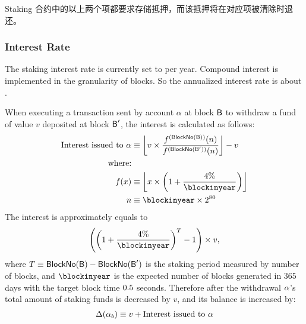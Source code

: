 Staking 合约中的以上两个项都要求存储抵押，而该抵押将在对应项被清除时退还。



\subsubsection{Interest Rate}

The staking interest rate is currently set to \interest per year.
Compound interest is implemented in the granularity of blocks.
So the annualized interest rate is about \annualinterest.

When executing a transaction sent by account $\alpha$ at block $\textsf{B}$ to withdraw a fund of value $v$ deposited at block $\textsf{B}'$,
the interest is calculated as follows:
\begin{align}
	\text{Interest issued to $\account$} 
	&\eqdef \left\lfloor v \times \frac{f^{(\blockno(\block))}(n)}{f^{(\blockno(\block'))}(n)} \right\rfloor- v \\ 
	\mbox{where:}& \\
	f(x) &\eqdef \left\lfloor x \times \left(1+\frac{\interest}{\blockinyear}\right)\right\rfloor \\
	n &\eqdef \blockinyear \times 2^{80}
\end{align}
The interest is approximately equals to 
\begin{align}
	\left(\left(1+\frac{\interest}{\blockinyear}\right)^T-1\right)\times v, 
\end{align}
where $T\equiv\mathsf{BlockNo}(\textsf{B}) - \mathsf{BlockNo}(\textsf{B}')$ is the staking period measured by number of blocks, 
and $\blockinyear$ is the expected number of blocks generated in $365$ days with the target block time $0.5$ seconds.
% 
Therefore after the withdrawal $\mathbf{\alpha}$'s total amount of staking funds is decreased by $v$,
and its balance is increased by:
\begin{align}
	\Delta(\mathbf{\alpha}_b) \equiv v + \text{Interest issued to $\mathbf{\alpha}$} 
\end{align}

